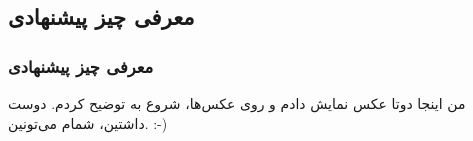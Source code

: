\label{introduction_to_suggested_detection_platform}

\subsection{معرفی چیز پیشنهادی}
\begin{frame}
\frametitle{معرفی چیز پیشنهادی}

\pause

من اینجا دوتا عکس نمایش دادم و روی عکس‌ها، شروع به توضیح کردم. دوست داشتین، شمام می‌تونین. :-)


\end{frame}
